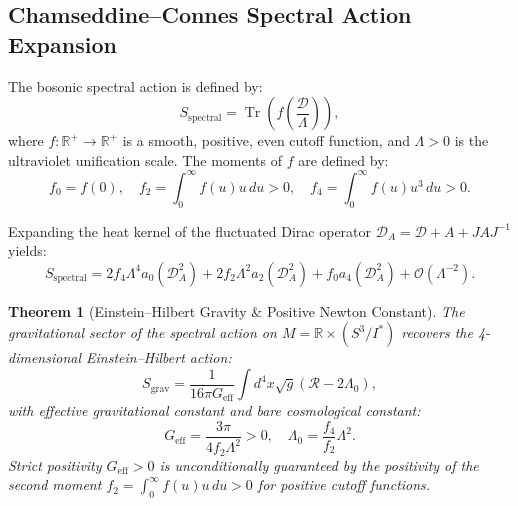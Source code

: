 \documentclass[11pt,a4paper]{article}
\newtheorem{theorem}{Theorem}[section]
\theoremstyle{definition}
\DeclareMathOperator{\Tr}{Tr}
\begin{document}
\subsection{Chamseddine--Connes Spectral Action Expansion}
The bosonic spectral action is defined by:
\begin{equation}
S_{\mathrm{spectral}} = \Tr\left( f\left( \frac{\mathcal{D}}{\Lambda} \right) \right),
\end{equation}
where $f: \mathbb{R}^+ \to \mathbb{R}^+$ is a smooth, positive, even cutoff function, and $\Lambda > 0$ is the ultraviolet unification scale. The moments of $f$ are defined by:
\begin{equation}
f_0 = f(0), \quad f_2 = \int_0^\infty f(u) u \, du > 0, \quad f_4 = \int_0^\infty f(u) u^3 \, du > 0.
\end{equation}

Expanding the heat kernel of the fluctuated Dirac operator $\mathcal{D}_A = \mathcal{D} + A + J A J^{-1}$ yields:
\begin{equation}
S_{\mathrm{spectral}} = 2 f_4 \Lambda^4 a_0(\mathcal{D}_A^2) + 2 f_2 \Lambda^2 a_2(\mathcal{D}_A^2) + f_0 a_4(\mathcal{D}_A^2) + \mathcal{O}\left(\Lambda^{-2}\right).
\end{equation}

\begin{theorem}[Einstein--Hilbert Gravity \& Positive Newton Constant]
The gravitational sector of the spectral action on $M = \mathbb{R} \times (S^3 / I^*)$ recovers the 4-dimensional Einstein--Hilbert action:
\begin{equation}
S_{\mathrm{grav}} = \frac{1}{16\pi G_{\mathrm{eff}}} \int d^4 x \sqrt{g} \left( \mathcal{R} - 2 \Lambda_0 \right),
\end{equation}
with effective gravitational constant and bare cosmological constant:
\begin{equation}
G_{\mathrm{eff}} = \frac{3\pi}{4 f_2 \Lambda^2} > 0, \quad \Lambda_0 = \frac{f_4}{f_2} \Lambda^2.
\end{equation}
Strict positivity $G_{\mathrm{eff}} > 0$ is unconditionally guaranteed by the positivity of the second moment $f_2 = \int_0^\infty f(u) u \, du > 0$ for positive cutoff functions.
\end{theorem}
\end{document}
